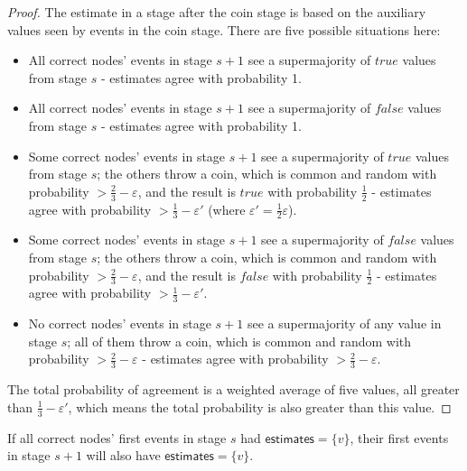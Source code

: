 \documentclass[a4paper,fleqn]{article}
\begin{document}
\begin{proof}
	The estimate in a stage after the coin stage is based on the auxiliary values seen by events
	in the coin stage. There are five possible situations here:

	\begin{itemize}
			\item All correct nodes' events in stage $s+1$ see a supermajority of $true$ values
				from stage $s$ - estimates agree with probability 1.
			\item All correct nodes' events in stage $s+1$ see a supermajority of $false$ values
				from stage $s$ - estimates agree with probability 1.
			\item Some correct nodes' events in stage $s+1$ see a supermajority of $true$ values
				from stage $s$; the others throw a coin, which is common and random with
				probability $> \frac{2}{3}-\varepsilon$, and the result is $true$ with probability 
				$\frac{1}{2}$ - estimates agree with probability $> \frac{1}{3} - \varepsilon'$
				(where $\varepsilon' = \frac{1}{2}\varepsilon$).
			\item Some correct nodes' events in stage $s+1$ see a supermajority of $false$ values
				from stage $s$; the others throw a coin, which is common and random with
				probability $> \frac{2}{3}-\varepsilon$, and the result is $false$ with probability 
				$\frac{1}{2}$ - estimates agree with probability $> \frac{1}{3} - \varepsilon'$.
			\item No correct nodes' events in stage $s+1$ see a supermajority of any value in stage
				$s$; all of them throw a coin, which is common and random with probability
				$> \frac{2}{3} - \varepsilon$ - estimates agree with probability $> \frac{2}{3} -
				\varepsilon$.
	\end{itemize}

	The total probability of agreement is a weighted average of five values, all greater than
	$\frac{1}{3} - \varepsilon'$, which means the total probability is also greater than
	this value.
\end{proof}

\begin{lem}\label{claimb}
	If all correct nodes' first events in stage $s$ had $\mathsf{estimates} = \{v\}$, their first
	events in stage $s+1$ will also have $\mathsf{estimates} = \{v\}$.
\end{lem}
\end{document}
